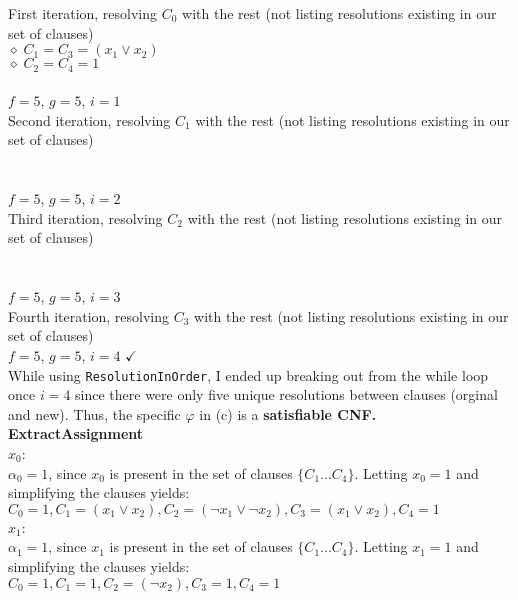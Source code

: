 \documentclass[11pt]{article}
\begin{document}
\begin{enumerate}
\begin{enumerate}
      First iteration, resolving $C_0$ with the rest (not listing resolutions existing in our set of clauses) \\
      $\diamond \; C_1 = C_3 = (x_1 \vee x_2)$ \\
      $\diamond \; C_2 = C_4 = 1$ \\
      \\
      $f=5$, $g = 5$, $i=1$ \\

      Second iteration, resolving $C_1$ with the rest (not listing resolutions existing in our set of clauses) \\
       \\
      \\
      $f= 5$, $g = 5$, $i=2$ \\

      Third iteration, resolving $C_2$ with the rest (not listing resolutions existing in our set of clauses) \\
       \\
      \\
      $f= 5$, $g = 5$, $i=3$ \\

      Fourth iteration, resolving $C_3$ with the rest (not listing resolutions existing in our set of clauses) \\
       $f= 5$, $g = 5$, $i=4$   $\checkmark$ \\

       While using \texttt{ResolutionInOrder}, I ended up breaking out from the while loop once $i=4$ since there were only five unique resolutions between clauses (orginal and new). Thus, the specific $\varphi$ in (c) is a \textbf{satisfiable CNF.} \\

      \textbf{ExtractAssignment} \\

      $x_0$: \\
      $\alpha_0 = 1$, since $x_0$ is present in the set of clauses $\{ C_1 ... C_4 \}$. Letting $x_0 = 1$ and simplifying the clauses yields: \\
      $C_0 = 1, C_1 = (x_1 \vee x_2), C_2 = (\neg x_1 \vee \neg x_2), C_3 = (x_1 \vee x_2), C_4 = 1$ \\

      $x_1$: \\
      $\alpha_1 = 1$, since $x_1$ is present in the set of clauses $\{ C_1 ... C_4 \}$. Letting $x_1 = 1$ and simplifying the clauses yields: \\
      $C_0 = 1, C_1 = 1, C_2 = (\neg x_2), C_3 = 1, C_4 = 1$ \\


\end{enumerate}
\end{enumerate}
\end{document}
